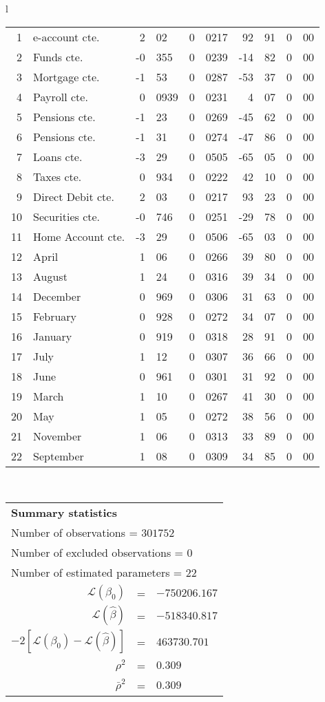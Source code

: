 \begin{tabular}{l}
\begin{tabular}{rlr@{.}lr@{.}lr@{.}lr@{.}l}
1 & e-account cte. & 2&02 & 0&0217 & 92&91 & 0&00\\
2 & Funds cte. & -0&355 & 0&0239 & -14&82 & 0&00\\
3 & Mortgage cte. & -1&53 & 0&0287 & -53&37 & 0&00\\
4 & Payroll cte. & 0&0939 & 0&0231 & 4&07 & 0&00\\
5 & Pensions cte. & -1&23 & 0&0269 & -45&62 & 0&00\\
6 & Pensions cte. & -1&31 & 0&0274 & -47&86 & 0&00\\
7 & Loans cte. & -3&29 & 0&0505 & -65&05 & 0&00\\
8 & Taxes cte. & 0&934 & 0&0222 & 42&10 & 0&00\\
9 & Direct Debit cte. & 2&03 & 0&0217 & 93&23 & 0&00\\
10 & Securities cte. & -0&746 & 0&0251 & -29&78 & 0&00\\
11 & Home Account cte. & -3&29 & 0&0506 & -65&03 & 0&00\\
12 & April & 1&06 & 0&0266 & 39&80 & 0&00\\
13 & August & 1&24 & 0&0316 & 39&34 & 0&00\\
14 & December & 0&969 & 0&0306 & 31&63 & 0&00\\
15 & February & 0&928 & 0&0272 & 34&07 & 0&00\\
16 & January & 0&919 & 0&0318 & 28&91 & 0&00\\
17 & July & 1&12 & 0&0307 & 36&66 & 0&00\\
18 & June & 0&961 & 0&0301 & 31&92 & 0&00\\
19 & March & 1&10 & 0&0267 & 41&30 & 0&00\\
20 & May & 1&05 & 0&0272 & 38&56 & 0&00\\
21 & November & 1&06 & 0&0313 & 33&89 & 0&00\\
22 & September & 1&08 & 0&0309 & 34&85 & 0&00\\
\hline
\end{tabular}
\\
\begin{tabular}{rcl}
\multicolumn{3}{l}{\bf Summary statistics}\\
\multicolumn{3}{l}{ Number of observations = $301752$} \\
\multicolumn{3}{l}{ Number of excluded observations = $0$} \\
\multicolumn{3}{l}{ Number of estimated  parameters = $22$} \\
 $\mathcal{L}(\beta_0)$ &=&  $-750206.167$ \\
 $\mathcal{L}(\hat{\beta})$ &=& $-518340.817 $  \\
 $-2[\mathcal{L}(\beta_0) -\mathcal{L}(\hat{\beta})]$ &=& $463730.701$ \\
    $\rho^2$ &=&   $0.309$ \\
    $\bar{\rho}^2$ &=&    $0.309$ \\
\end{tabular}
  \end{tabular}
